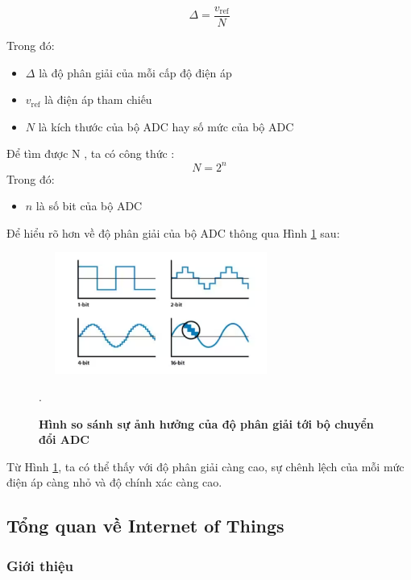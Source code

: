\documentclass{article} %
\begin{document}
	\begin{equation}
		\Delta = \frac{v_{\text{ref}}}{N}    
	\end{equation}
	
	Trong đó:
	\begin{itemize}
		\item \( \Delta \) là độ phân giải của mỗi cấp độ điện áp
		\item \( v_{\text{ref}} \) là điện áp tham chiếu
		\item \( N \) là kích thước của bộ ADC hay số mức của bộ ADC
	\end{itemize}
	
	Để tìm được N , ta có công thức :
	\begin{equation}
		N = {2}^{n}
	\end{equation}
	Trong đó:
	\begin{itemize}
		\item \( n \) là số bit của bộ ADC
	\end{itemize}
	
	Để hiểu rõ hơn về độ phân giải của bộ ADC thông qua Hình \ref{ADCconvert} sau:
	
	\begin{figure}[!ht]
		\centering
		\includegraphics[width=8cm,height=4cm]{Images/ADCconvert.png}
		\caption[Hình so sánh sự ảnh hưởng của độ phân giải tới bộ chuyển đổi ADC\cite{Analog}]{\bfseries \fontsize{12pt}{0pt}\selectfont Hình so sánh sự ảnh hưởng của độ phân giải tới bộ chuyển đổi ADC\cite{Analog}}.
		\label{ADCconvert}
	\end{figure}
	
	Từ Hình \ref{ADCconvert}, ta có thể thấy với độ phân giải càng cao, sự chênh lệch của mỗi mức điện áp càng nhỏ và độ chính xác càng cao.
	
	\newpage
	\subsection{Tổng quan về Internet of Things}
	\subsubsection{Giới thiệu}
	
\end{document}
